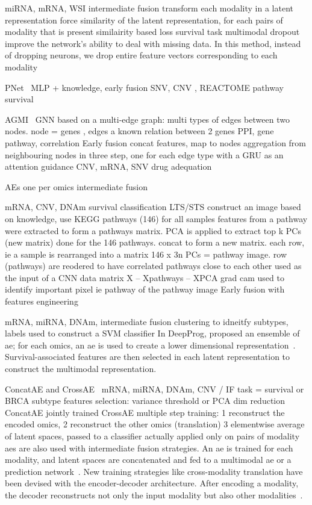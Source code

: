 \documentclass[../main.tex]{subfiles}
\begin{document}
		\cite{Cheerla2019}
		miRNA, mRNA, WSI
		intermediate fusion transform each modality in a latent representation
		force similarity of the latent representation, for each pairs of modality that is present similairity based loss
		survival task
		multimodal dropout improve the network’s ability to deal with missing data. In this method, instead of dropping neurons, we drop entire feature vectors corresponding to each modality

		PNet~\cite{PNet} MLP + knowledge, early fusion
		SNV, CNV , REACTOME pathway survival

		AGMI~\cite{AGMI} GNN based on a multi-edge graph: multi types of edges between two nodes. node = genes , edges a known relation between 2 genes PPI, gene pathway, correlation
		Early fusion concat features, map to nodes
		aggregation from neighbouring nodes in three step, one for each edge type with a GRU as an attention guidance
		CNV, mRNA, SNV drug adequation

		\cite{Ma2019} AEs one per omics intermediate fusion

		\cite{PathCNN}
		mRNA, CNV, DNAm survival classification LTS/STS
		construct an image based on knowledge, use KEGG pathways (146)
		for all samples features from a pathway were extracted to form a pathways matrix. PCA is applied to extract top k PCs (new matrix) done for the 146 pathways. concat to form a new matrix.
		each row, ie a sample is rearranged into a matrix 146 x 3n PCs = pathway image. row (pathways) are reodered to have correlated pathways close to each other
		used as the input of a CNN
		data matrix X -- Xpathways -- XPCA
		grad cam used to identify important pixel ie pathway of the pathway image
		Early fusion with features engineering

		\cite{DeepProg} mRNA, miRNA, DNAm, intermediate fusion
		clustering to idneitfy subtypes, labels used to construct a SVM classifier
		In DeepProg, \citeauthor{DeepProg} proposed an ensemble of \gls{ae}; for each omics, an \gls{ae} is used to create a lower dimensional representation~\cite{DeepProg}.
		Survival-associated features are then selected in each latent representation to construct the multimodal representation.

		ConcatAE and CrossAE~\cite{CrossAE} mRNA, miRNA, DNAm, CNV / IF
		task = survival or BRCA subtype
		features selection: variance threshold or PCA dim reduction
		ConcatAE jointly trained
		CrossAE multiple step training: 1 reconstruct the encoded omics, 2 reconstruct the other omics (translation) 3 elementwise average of latent spaces, passed to a classifier
		actually applied only on pairs of modality
		\glspl{ae} are also used with intermediate fusion strategies.
		An \gls{ae} is trained for each modality, and latent spaces are concatenated and fed to a multimodal \gls{ae} or a prediction network~\cite{CrossAE, HierachicalAE}.
		New training strategies like cross-modality translation have been devised with the encoder-decoder architecture.
		After encoding a modality, the decoder reconstructs not only the input modality but also other modalities~\cite{CrossAE}.
\end{document}
